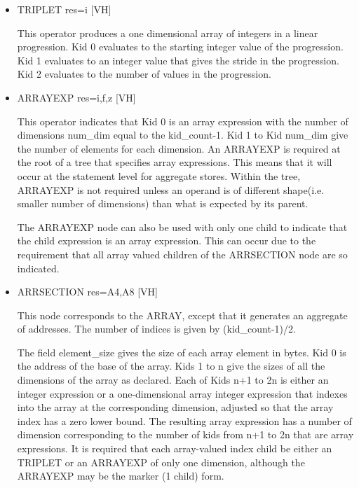 \documentclass{article}
\begin{document}
\begin{itemize}
\item
{}%
TRIPLET res=i \hfill [VH]

This operator produces a one dimensional array of integers in a
linear progression. Kid 0 evaluates to the starting integer value
of the progression. Kid 1 evaluates to an integer value that gives
the stride in the progression. Kid 2 evaluates to the number of
values in the progression.

\item
{}%
ARRAYEXP res=i,f,z \hfill [VH]

This operator indicates that Kid 0 is an array expression with the
number of dimensions num\_dim equal to the kid\_count-1. Kid 1 to Kid
num\_dim give the number of elements for each dimension. An
%
ARRAYEXP is
required at the root of a tree that specifies array expressions.
This means that it will occur at the statement level for aggregate
stores. Within the tree,
%
ARRAYEXP is not required unless an operand is of different shape(i.e.
smaller number of dimensions) than what is expected by its parent.

The
%
ARRAYEXP node can also be used with only one child to indicate
that the child expression is an array expression. This can occur
due to the requirement that all array valued children of the
%
ARRSECTION node are so indicated.

\item
{}%
ARRSECTION res=A4,A8 \hfill [VH]

This node corresponds to the
%
ARRAY, except that it generates an
aggregate of addresses. The number of indices is given by
(kid\_count-1)/2.

The field element\_size gives the size of each array element in
bytes. Kid 0 is the address of the base of the array. Kids 1 to n
give the sizes of all the dimensions of the array as declared. Each
of Kids n+1 to 2n is either an integer expression or a one-dimensional
array integer expression that indexes into the array at the
corresponding dimension, adjusted so that the array index has a zero
lower bound. The resulting array expression has a number of dimension
corresponding to the number of kids from n+1 to 2n that are array
expressions. It is required that each array-valued index child be
either an
%
TRIPLET or an
%
ARRAYEXP of only one dimension, although
the
%
ARRAYEXP may be the marker (1 child) form.


\end{itemize}
\end{document}
